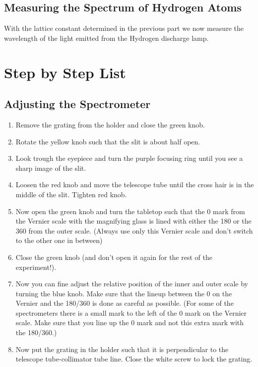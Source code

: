 \subsection{Measuring the Spectrum of Hydrogen Atoms}
With the lattice constant determined in the previous part we now measure the wavelength of the light emitted from the Hydrogen discharge lamp.

\section{Step by Step List}
\subsection{Adjusting the Spectrometer}
\begin{enumerate}
\item Remove the grating from the holder and close the green knob.

\item Rotate the yellow knob such that the slit is about half open.

\item Look trough the eyepiece and turn the purple focusing ring until you see a sharp image of the slit.

\item Loosen the red knob and move the telescope tube until the cross hair is in the middle of the slit. Tighten red knob.

\item Now open the green knob and turn the tabletop such that the 0 mark from the Vernier scale with the magnifying glass is lined with either the 180 or the 360 from the outer scale. (Always use only this Vernier scale and don't switch to the other one in between)

\item Close the green knob (and don't open it again for the rest of the experiment!).

\item Now you can fine adjust the relative position of the inner and outer scale by turning the blue knob. Make sure that the lineup between the 0 on the Vernier and the 180/360 is done as careful as possible. (For some of the spectrometers there is a small mark to the left of the 0 mark on the Vernier scale. Make sure that you line up the 0 mark and not this extra mark with the 180/360.)

\item Now put the grating in the holder such that it is perpendicular to the telescope tube-collimator tube line. Close the white screw to lock the grating.
\end{enumerate}

